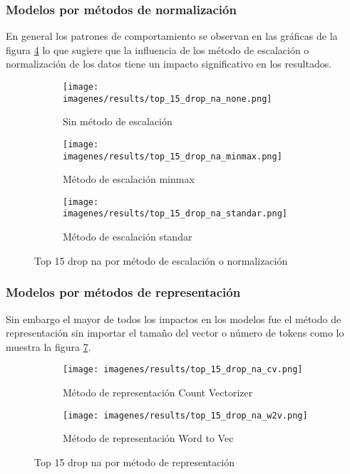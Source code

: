 \documentclass[12pt]{article}
\begin{document}
			\subsubsection{Modelos por métodos de normalización}
			\label{sec:x_metodo_scaler}
			En general los patrones de comportamiento se observan en las gráficas de la figura \ref{fig:by_scaler} lo que sugiere que la influencia de los método de escalación o normalización de los datos tiene un impacto significativo en los resultados.
				\begin{figure}[htp]
				\centering\begin{subfigure}[b]{0.5\linewidth} 
					\centering\texttt{[image: imagenes/results/top\_15\_drop\_na\_none.png]} 
					\caption{\label{fig:top_15_drop_na_none}Sin  método de escalación} 
				\end{subfigure}\hfill
				\begin{subfigure}[b]{0.5\linewidth} 
					\centering\texttt{[image: imagenes/results/top\_15\_drop\_na\_minmax.png]} 
					\caption{\label{fig:top_15_drop_na_minmax}Método de escalación minmax} 
				\end{subfigure}\vspace{10pt}
				
				\begin{subfigure}[b]{\linewidth} 
					\centering\texttt{[image: imagenes/results/top\_15\_drop\_na\_standar.png]} 
					\caption{\label{fig:top_15_drop_na_standar}Método de escalación standar} 
				\end{subfigure} 
				\caption{Top 15 drop na por método de escalación o normalización} 
				\label{fig:by_scaler}
				\end{figure}
									
			\subsubsection{Modelos por métodos de representación}
			\label{sec:x_metodo_representacion}
			Sin embargo el mayor de todos los impactos en los modelos fue el método de representación sin importar el tamaño del vector o número de tokens como lo muestra la figura \ref{fig:by_representacion}.
				\begin{figure}[htp]
				\centering\begin{subfigure}[b]{0.5\linewidth} 
					\centering\texttt{[image: imagenes/results/top\_15\_drop\_na\_cv.png]} 
					\caption{\label{fig:top_15_drop_na_cv}Método de representación Count Vectorizer} 
				\end{subfigure}\hfill
				\begin{subfigure}[b]{0.5\linewidth} 
					\centering\texttt{[image: imagenes/results/top\_15\_drop\_na\_w2v.png]} 
					\caption{\label{fig:top_15_drop_na_w2v}Método de representación Word to Vec} 
				\end{subfigure}
				
				\caption{Top 15 drop na por método de representación} 
				\label{fig:by_representacion}
				\end{figure}
				
\end{document}

